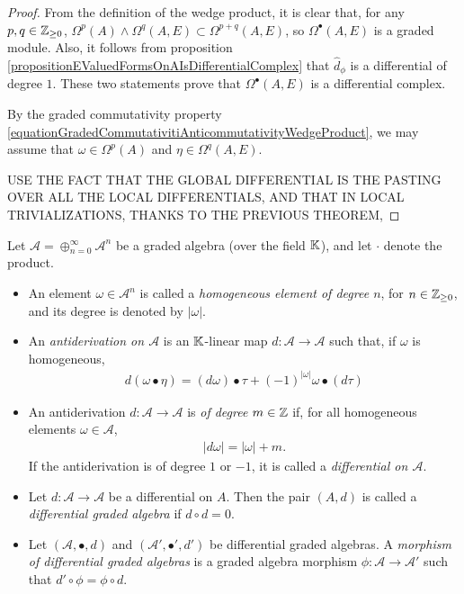 \begin{proof}
From the definition of the wedge product, it is clear that, for any $p, q \in \mathbb{Z}_{\geq 0}$, $\Omega^p(A) \wedge \Omega^q(A, E) \subset \Omega^{p+q}(A, E)$, so $\Omega^\bullet(A, E)$ is a graded module. Also, it follows from proposition \ref{propositionEValuedFormsOnAIsDifferentialComplex} that $\hat d_\phi$ is a differential of degree $1$. These two statements prove that $\Omega^\bullet(A, E)$ is a differential complex.


By the graded commutativity property \eqref{equationGradedCommutativitiAnticommutativityWedgeProduct}, we may assume that $\omega \in \Omega^p(A)$ and  $\eta \in \Omega^q(A, E)$.  

USE THE FACT THAT THE GLOBAL DIFFERENTIAL IS THE PASTING OVER ALL THE LOCAL DIFFERENTIALS, AND THAT IN LOCAL TRIVIALIZATIONS, THANKS TO THE PREVIOUS THEOREM,

\end{proof}

\lin

\begin{definition} \label{defnDiffGAlgebra}
Let $\mathcal A = \oplus_{n = 0}^\infty \mathcal A^n$ be a graded algebra (over the field $\mathbb{K}$), and let $\cdot$ denote the product.
    \begin{itemize}
    
    \item An element $\omega \in \mathcal A^n$ is called a \emph{homogeneous element of degree $n$}, for $n \in \mathbb{Z}_{\geq 0}$, and its degree is denoted by $|\omega|$.
    
    \item An \emph{antiderivation on $\mathcal A$} is an $\mathbb{K}$-linear map $d: \mathcal A \to \mathcal A$ such that, if $\omega$ is homogeneous, 
    \begin{align*}
        d(\omega \bullet \eta) = (d\omega)\bullet\tau + (-1)^{|\omega|} \omega \bullet (d\tau)
    \end{align*}
    
    \item An antiderivation $d: \mathcal A \to \mathcal A$ is \emph{of degree $m \in \mathbb{Z}$} if, for all homogeneous elements $\omega \in \mathcal A$,
    \begin{align*}
        |d\omega| = |\omega| + m.
    \end{align*}
    If the antiderivation is of degree $1$ or $-1$, it is called a \emph{differential on $\mathcal A$}.
    
    \item Let $d: \mathcal A \to \mathcal A$ be a differential on $A$. Then the pair $(A, d)$ is called a \emph{differential graded algebra} if $d \circ d = 0$. 
    
    \item Let $(\mathcal A, \bullet, d)$ and $(\mathcal A', \bullet', d')$ be differential graded algebras. A \emph{morphism of differential graded algebras} is a graded algebra morphism $\phi: \mathcal A \to \mathcal A'$ such that $d' \circ \phi = \phi \circ d$.
    
    \end{itemize}
    
\end{definition}


